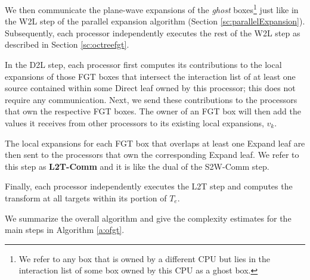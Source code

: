  We then communicate the plane-wave expansions of the {\em ghost} boxes\footnote{We refer to any box that
 is owned by a different CPU but lies in the interaction list of some box owned by this CPU as a ghost box.} just
 like in the W2L step of the parallel expansion algorithm (Section \ref{sc:parallelExpansion}). Subsequently, each processor 
 independently executes the rest of the W2L step as described in Section \ref{sc:octreefgt}.

In the D2L step, each processor first computes its contributions to the local expansions of those FGT boxes that intersect
 the interaction list of at least one source contained within some Direct leaf owned by this processor; this does not 
 require any communication. Next, we send these contributions to the processors that own the respective FGT boxes. The owner of
an FGT box will then add the values it receives from other processors to its existing local expansions, $v_k$.

The local expansions for each FGT box that overlaps at least one Expand leaf are then sent to the processors that own
 the corresponding Expand leaf. We refer to this step as {\textbf{L2T-Comm}} and it is like the dual of the S2W-Comm step. 
 
Finally, each processor independently executes the L2T step and computes the transform at all targets within its portion of $T_e$.

We summarize the overall algorithm and give the complexity estimates for the main steps in Algorithm \ref{a:ofgt}.  

